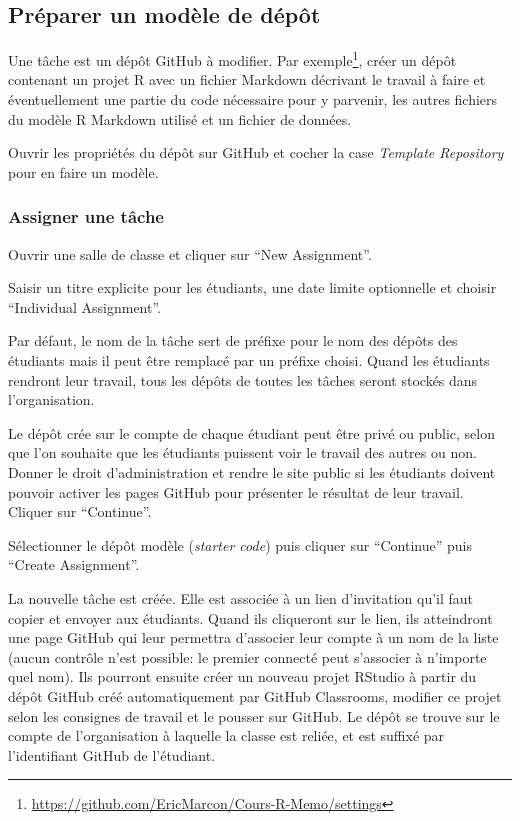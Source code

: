 \documentclass[
  12pt,
  french,
  a4paper,
  extrafontsizes,onecolumn,openright
  ]{memoir}
\begin{document}
\subsection{Préparer un modèle de dépôt}\label{pruxe9parer-un-moduxe8le-de-duxe9puxf4t}

Une tâche est un dépôt GitHub à modifier.
Par exemple\footnote{\url{https://github.com/EricMarcon/Cours-R-Memo/settings}}, créer un dépôt contenant un projet R avec un fichier Markdown décrivant le travail à faire et éventuellement une partie du code nécessaire pour y parvenir, les autres fichiers du modèle R Markdown utilisé et un fichier de données.

Ouvrir les propriétés du dépôt sur GitHub et cocher la case \emph{Template Repository} pour en faire un modèle.

\subsubsection{Assigner une tâche}\label{assigner-une-tuxe2che}

Ouvrir une salle de classe et cliquer sur \enquote{New Assignment}.

Saisir un titre explicite pour les étudiants, une date limite optionnelle et choisir \enquote{Individual Assignment}.

Par défaut, le nom de la tâche sert de préfixe pour le nom des dépôts des étudiants mais il peut être remplacé par un préfixe choisi.
Quand les étudiants rendront leur travail, tous les dépôts de toutes les tâches seront stockés dans l'organisation.

Le dépôt crée sur le compte de chaque étudiant peut être privé ou public, selon que l'on souhaite que les étudiants puissent voir le travail des autres ou non.
Donner le droit d'administration et rendre le site public si les étudiants doivent pouvoir activer les pages GitHub pour présenter le résultat de leur travail.
Cliquer sur \enquote{Continue}.

Sélectionner le dépôt modèle (\emph{starter code}) puis cliquer sur \enquote{Continue} puis \enquote{Create Assignment}.

La nouvelle tâche est créée.
Elle est associée à un lien d'invitation qu'il faut copier et envoyer aux étudiants.
Quand ils cliqueront sur le lien, ils atteindront une page GitHub qui leur permettra d'associer leur compte à un nom de la liste (aucun contrôle n'est possible: le premier connecté peut s'associer à n'importe quel nom).
Ils pourront ensuite créer un nouveau projet RStudio à partir du dépôt GitHub créé automatiquement par GitHub Classrooms, modifier ce projet selon les consignes de travail et le pousser sur GitHub.
Le dépôt se trouve sur le compte de l'organisation à laquelle la classe est reliée, et est suffixé par l'identifiant GitHub de l'étudiant.
\end{document}
